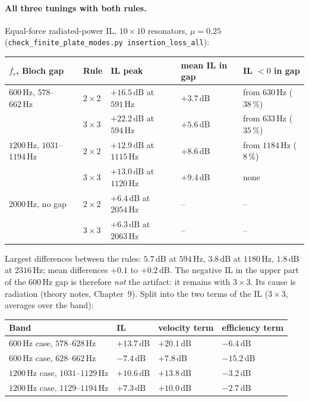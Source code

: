 \paragraph{All three tunings with both rules.} Equal-force radiated-power IL, $10 \times 10$
resonators, $\mu = 0.25$ (\texttt{check\_finite\_plate\_modes.py insertion\_loss\_all}):
\begin{center}
\begin{tabular}{|l|l|l|l|l|}
\hline
$f_r$, Bloch gap & Rule & IL peak & mean IL in gap & IL $< 0$ in gap \\
\hline
$600\,\mathrm{Hz}$, $578$--$662\,\mathrm{Hz}$ & $2\times 2$ & $+16.5\,\mathrm{dB}$ at $591\,\mathrm{Hz}$ & $+3.7\,\mathrm{dB}$ & from $630\,\mathrm{Hz}$ ($38\,\%$) \\
 & $3\times 3$ & $+22.2\,\mathrm{dB}$ at $594\,\mathrm{Hz}$ & $+5.6\,\mathrm{dB}$ & from $633\,\mathrm{Hz}$ ($35\,\%$) \\
$1200\,\mathrm{Hz}$, $1031$--$1194\,\mathrm{Hz}$ & $2\times 2$ & $+12.9\,\mathrm{dB}$ at $1115\,\mathrm{Hz}$ & $+8.6\,\mathrm{dB}$ & from $1184\,\mathrm{Hz}$ ($8\,\%$) \\
 & $3\times 3$ & $+13.0\,\mathrm{dB}$ at $1120\,\mathrm{Hz}$ & $+9.4\,\mathrm{dB}$ & none \\
$2000\,\mathrm{Hz}$, no gap & $2\times 2$ & $+6.4\,\mathrm{dB}$ at $2054\,\mathrm{Hz}$ & -- & -- \\
 & $3\times 3$ & $+6.3\,\mathrm{dB}$ at $2063\,\mathrm{Hz}$ & -- & -- \\
\hline
\end{tabular}
\end{center}
Largest differences between the rules: $5.7\,\mathrm{dB}$ at $594\,\mathrm{Hz}$,
$3.8\,\mathrm{dB}$ at $1180\,\mathrm{Hz}$, $1.8\,\mathrm{dB}$ at $2316\,\mathrm{Hz}$; mean
differences $+0.1$ to $+0.2\,\mathrm{dB}$. The negative IL in the upper part of the
$600\,\mathrm{Hz}$ gap is therefore \emph{not} the artifact: it remains with $3\times 3$.
Its cause is radiation (theory notes, Chapter~9). Split into the two terms of the IL
($3\times 3$, averages over the band):
\begin{center}
\begin{tabular}{|l|l|l|l|}
\hline
Band & IL & velocity term & efficiency term \\
\hline
$600\,\mathrm{Hz}$ case, $578$--$628\,\mathrm{Hz}$ & $+13.7\,\mathrm{dB}$ & $+20.1\,\mathrm{dB}$ & $-6.4\,\mathrm{dB}$ \\
$600\,\mathrm{Hz}$ case, $628$--$662\,\mathrm{Hz}$ & $-7.4\,\mathrm{dB}$ & $+7.8\,\mathrm{dB}$ & $-15.2\,\mathrm{dB}$ \\
$1200\,\mathrm{Hz}$ case, $1031$--$1129\,\mathrm{Hz}$ & $+10.6\,\mathrm{dB}$ & $+13.8\,\mathrm{dB}$ & $-3.2\,\mathrm{dB}$ \\
$1200\,\mathrm{Hz}$ case, $1129$--$1194\,\mathrm{Hz}$ & $+7.3\,\mathrm{dB}$ & $+10.0\,\mathrm{dB}$ & $-2.7\,\mathrm{dB}$ \\
\hline
\end{tabular}
\end{center}
